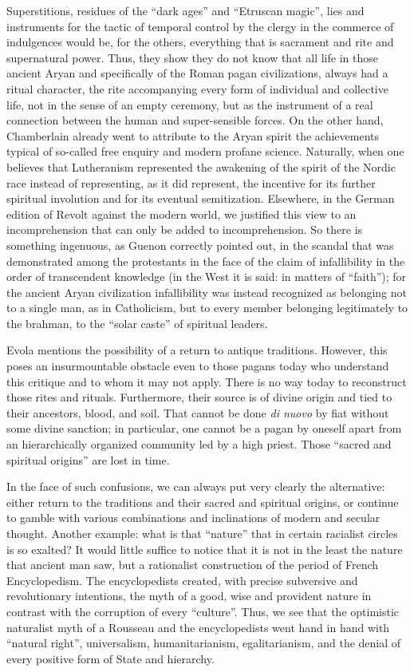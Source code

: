 Superstitions, residues of the ``dark ages'' and ``Etruscan magic'', lies and instruments for the tactic of temporal control by the clergy in the commerce of indulgences would be, for the others, everything that is sacrament and rite and supernatural power. Thus, they show they do not know that all life in those ancient Aryan and specifically of the Roman pagan civilizations, always had a ritual character, the rite accompanying every form of individual and collective life, not in the sense of an empty ceremony, but as the instrument of a real connection between the human and super-sensible forces. On the other hand, Chamberlain already went to attribute to the Aryan spirit the achievements typical of so-called free enquiry and modern profane science. Naturally, when one believes that Lutheranism represented the awakening of the spirit of the Nordic race instead of representing, as it did represent, the incentive for its further spiritual involution and for its eventual semitization. Elsewhere, in the German edition of Revolt against the modern world, we justified this view to an incomprehension that can only be added to incomprehension. So there is something ingenuous, as Guenon correctly pointed out, in the scandal that was demonstrated among the protestants in the face of the claim of infallibility in the order of transcendent knowledge (in the West it is said: in matters of ``faith''); for the ancient Aryan civilization infallibility was instead recognized as belonging not to a single man, as in Catholicism, but to every member belonging legitimately to the brahman, to the ``solar caste'' of spiritual leaders.

\begin{quotex}
Evola mentions the possibility of a return to antique traditions. However, this poses an insurmountable obstacle even to those pagans today who understand this critique and to whom it may not apply. There is no way today to reconstruct those rites and rituals. Furthermore, their source is of divine origin and tied to their ancestors, blood, and soil. That cannot be done \emph{di nuovo} by fiat without some divine sanction; in particular, one cannot be a pagan by oneself apart from an hierarchically organized community led by a high priest. Those ``sacred and spiritual origins'' are lost in time.
\end{quotex}

In the face of such confusions, we can always put very clearly the alternative: either return to the traditions and their sacred and spiritual origins, or continue to gamble with various combinations and inclinations of modern and secular thought. Another example: what is that ``nature'' that in certain racialist circles is so exalted? It would little suffice to notice that it is not in the least the nature that ancient man saw, but a rationalist construction of the period of French Encyclopedism. The encyclopedists created, with precise subversive and revolutionary intentions, the myth of a good, wise and provident nature in contrast with the corruption of every ``culture''. Thus, we see that the optimistic naturalist myth of a Rousseau and the encyclopedists went hand in hand with ``natural right'', universalism, humanitarianism, egalitarianism, and the denial of every positive form of State and hierarchy.

